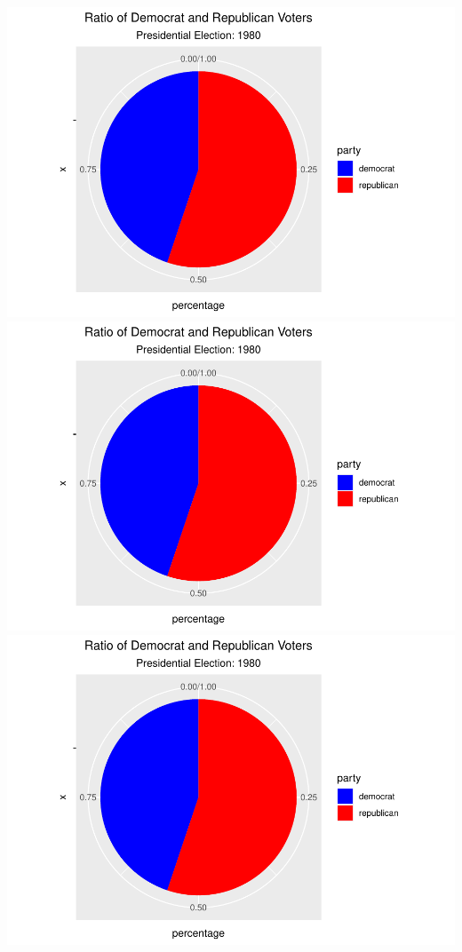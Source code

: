 \documentclass[
]{article}
\begin{document}
\includegraphics{election_files/figure-latex/anim-13.pdf}
\includegraphics{election_files/figure-latex/anim-14.pdf}
\includegraphics{election_files/figure-latex/anim-15.pdf}
\end{document}
